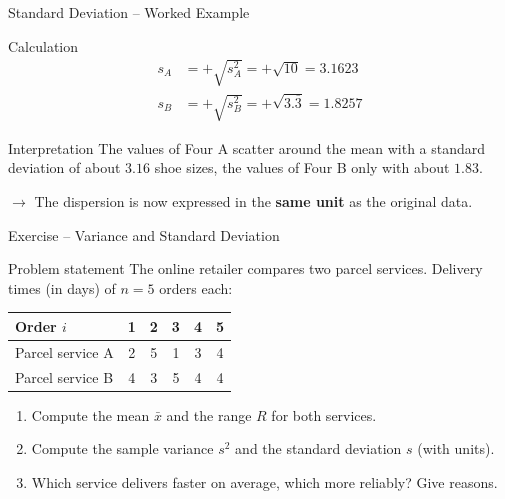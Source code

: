 \documentclass[aspectratio=169,11pt]{beamer}
\begin{document}
\begin{frame}{Standard Deviation -- Worked Example}

  \begin{exampleblock}{Calculation}
    \begin{align*}
      s_A &= +\sqrt{s^2_A} = +\sqrt{10} = 3.1623 \\[4pt]
      s_B &= +\sqrt{s^2_B} = +\sqrt{3.\overline{3}} = 1.8257
    \end{align*}
  \end{exampleblock}

  \vspace{0.1cm}

  \begin{alertblock}{Interpretation}
    The values of Four A scatter around the mean with a standard deviation of about
    $3.16$ shoe sizes, the values of Four B only with about $1.83$.

    $\to$ The dispersion is now expressed in the \textbf{same unit} as the original data.
  \end{alertblock}
\end{frame}

\begin{frame}{Exercise -- Variance and Standard Deviation}
  \begin{block}{Problem statement}
    The online retailer compares two parcel services. Delivery times (in days) of $n = 5$ orders each:
    \begin{center}
      \renewcommand{\arraystretch}{1.15}
      \begin{tabular}{lccccc}
        \toprule
        Order $i$ & 1 & 2 & 3 & 4 & 5 \\
        \midrule
        Parcel service A & 2 & 5 & 1 & 3 & 4 \\
        Parcel service B & 4 & 3 & 5 & 4 & 4 \\
        \bottomrule
      \end{tabular}
    \end{center}
    \begin{enumerate}
      \item[a)] Compute the mean $\bar{x}$ and the range $R$ for both services.
      \item[b)] Compute the sample variance $s^2$ and the standard deviation $s$ (with units).
      \item[c)] Which service delivers faster on average, which more reliably? Give reasons.
    \end{enumerate}
  \end{block}
\end{frame}
\end{document}
